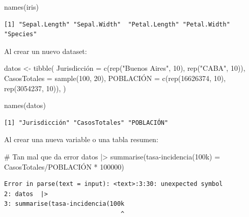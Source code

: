 \documentclass[
  spanish,
  a4paper,
]{scrbook}
\newenvironment{Shaded}{\begin{snugshade}}{\end{snugshade}}
\newcommand{\AttributeTok}[1]{\textcolor[rgb]{0.40,0.45,0.13}{#1}}
\newcommand{\CommentTok}[1]{\textcolor[rgb]{0.37,0.37,0.37}{#1}}
\newcommand{\DecValTok}[1]{\textcolor[rgb]{0.68,0.00,0.00}{#1}}
\newcommand{\FunctionTok}[1]{\textcolor[rgb]{0.28,0.35,0.67}{#1}}
\newcommand{\NormalTok}[1]{\textcolor[rgb]{0.00,0.23,0.31}{#1}}
\newcommand{\OtherTok}[1]{\textcolor[rgb]{0.00,0.23,0.31}{#1}}
\newcommand{\SpecialCharTok}[1]{\textcolor[rgb]{0.37,0.37,0.37}{#1}}
\newcommand{\StringTok}[1]{\textcolor[rgb]{0.13,0.47,0.30}{#1}}
\begin{document}
\begin{Shaded}
\begin{Highlighting}[]
\FunctionTok{names}\NormalTok{(iris)}
\end{Highlighting}
\end{Shaded}

\begin{verbatim}
[1] "Sepal.Length" "Sepal.Width"  "Petal.Length" "Petal.Width"  "Species"     
\end{verbatim}

Al crear un nuevo dataset:

\begin{Shaded}
\begin{Highlighting}[]
\NormalTok{datos }\OtherTok{\textless{}{-}} \FunctionTok{tibble}\NormalTok{(}
\NormalTok{  Jurisdicción }\OtherTok{=} \FunctionTok{c}\NormalTok{(}\FunctionTok{rep}\NormalTok{(}\StringTok{"Buenos Aires"}\NormalTok{, }\DecValTok{10}\NormalTok{), }\FunctionTok{rep}\NormalTok{(}\StringTok{"CABA"}\NormalTok{, }\DecValTok{10}\NormalTok{)),}
  \AttributeTok{CasosTotales =} \FunctionTok{sample}\NormalTok{(}\DecValTok{100}\NormalTok{, }\DecValTok{20}\NormalTok{),}
\NormalTok{  POBLACIÓN }\OtherTok{=} \FunctionTok{c}\NormalTok{(}\FunctionTok{rep}\NormalTok{(}\DecValTok{16626374}\NormalTok{, }\DecValTok{10}\NormalTok{), }\FunctionTok{rep}\NormalTok{(}\DecValTok{3054237}\NormalTok{, }\DecValTok{10}\NormalTok{)),}
\NormalTok{)}

\FunctionTok{names}\NormalTok{(datos)}
\end{Highlighting}
\end{Shaded}

\begin{verbatim}
[1] "Jurisdicción" "CasosTotales" "POBLACIÓN"   
\end{verbatim}

Al crear una nueva variable o una tabla resumen:

\begin{Shaded}
\begin{Highlighting}[]
\CommentTok{\# Tan mal que da error}
\NormalTok{datos  }\SpecialCharTok{|\textgreater{}} 
\FunctionTok{summarise}\NormalTok{(tasa}\SpecialCharTok{{-}}\FunctionTok{incidencia}\NormalTok{(}\DecValTok{100}\NormalTok{k) }\OtherTok{=}\NormalTok{ CasosTotales}\SpecialCharTok{/}\NormalTok{POBLACIÓN }\SpecialCharTok{*} \DecValTok{100000}\NormalTok{)}
\end{Highlighting}
\end{Shaded}

\begin{verbatim}
Error in parse(text = input): <text>:3:30: unexpected symbol
2: datos  |> 
3: summarise(tasa-incidencia(100k
                                ^
\end{verbatim}
\end{document}
